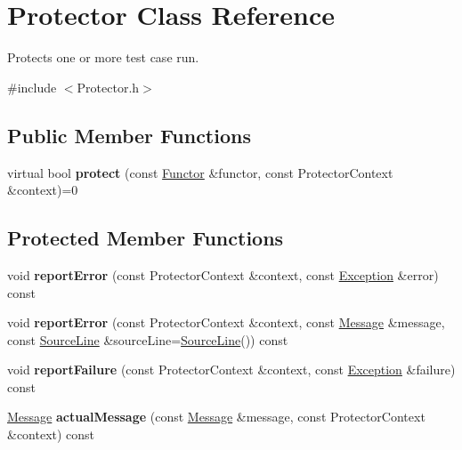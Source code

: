 \hypertarget{class_protector}{}\section{Protector Class Reference}
\label{class_protector}


Protects one or more test case run.  




{\ttfamily \#include $<$Protector.\+h$>$}

\subsection*{Public Member Functions}
\begin{DoxyCompactItemize}
\item 
virtual bool {\bfseries protect} (const \hyperlink{class_functor}{Functor} \&functor, const Protector\+Context \&context)=0\hypertarget{class_protector_a8e005ff581ca40431526fb873a03415a}{}\label{class_protector_a8e005ff581ca40431526fb873a03415a}

\end{DoxyCompactItemize}
\subsection*{Protected Member Functions}
\begin{DoxyCompactItemize}
\item 
void {\bfseries report\+Error} (const Protector\+Context \&context, const \hyperlink{class_exception}{Exception} \&error) const \hypertarget{class_protector_a94c08e57ebcf59ed093916c16384c99a}{}\label{class_protector_a94c08e57ebcf59ed093916c16384c99a}

\item 
void {\bfseries report\+Error} (const Protector\+Context \&context, const \hyperlink{class_message}{Message} \&message, const \hyperlink{class_source_line}{Source\+Line} \&source\+Line=\hyperlink{class_source_line}{Source\+Line}()) const \hypertarget{class_protector_ab1fda7a5e61e2033e2a7b848aa04690a}{}\label{class_protector_ab1fda7a5e61e2033e2a7b848aa04690a}

\item 
void {\bfseries report\+Failure} (const Protector\+Context \&context, const \hyperlink{class_exception}{Exception} \&failure) const \hypertarget{class_protector_ac52d8e2909a5621d2692ec3ce5d4dbc7}{}\label{class_protector_ac52d8e2909a5621d2692ec3ce5d4dbc7}

\item 
\hyperlink{class_message}{Message} {\bfseries actual\+Message} (const \hyperlink{class_message}{Message} \&message, const Protector\+Context \&context) const \hypertarget{class_protector_a259356bbf5f03e07f75ac797c9e34737}{}\label{class_protector_a259356bbf5f03e07f75ac797c9e34737}

\end{DoxyCompactItemize}


